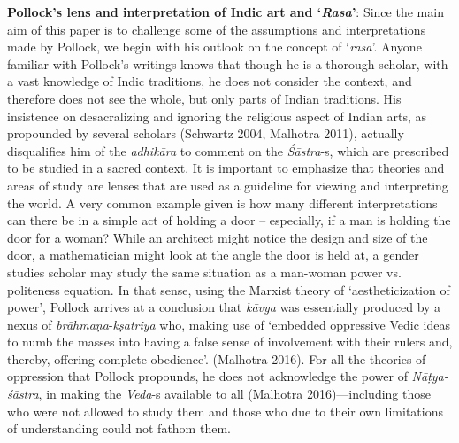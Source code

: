 \textbf{Pollock’s lens and interpretation of Indic art and ‘\textsl{Rasa}'}: Since the main aim of this paper is to challenge some of the assumptions and interpretations made by Pollock, we begin with his outlook on the concept of ‘\textsl{rasa}'. Anyone familiar with Pollock’s writings knows that though he is a thorough scholar, with a vast knowledge of Indic traditions, he does not consider the context, and therefore does not see the whole, but only parts of Indian traditions. His insistence on desacralizing and ignoring the religious aspect of Indian arts, as propounded by several scholars (Schwartz 2004, Malhotra 2011), actually disqualifies him of the \textsl{adhikāra} to comment on the \textsl{Śāstra}-s, which are prescribed to be studied in a sacred context. It is important to emphasize that theories and areas of study are lenses that are used as a guideline for viewing and interpreting the world. A very common example given is how many different interpretations can there be in a simple act of holding a door -- especially, if a man is holding the door for a woman? While an architect might notice the design and size of the door, a mathematician might look at the angle the door is held at, a gender studies scholar may study the same situation as a man-woman power vs. politeness equation. In that sense, using the Marxist theory of ‘aestheticization of power’, Pollock arrives at a conclusion that \textsl{kāvya} was essentially produced by a nexus of \textsl{brāhmaṇa}-\textsl{kṣatriya} who, making use of ‘embedded oppressive Vedic ideas to numb the masses into having a false sense of involvement with their rulers and, thereby, offering complete obedience’. (Malhotra 2016). For all the theories of oppression that Pollock propounds, he does not acknowledge the power of \textsl{Nāṭya-śāstra}, in making the \textsl{Veda}-s available to all (Malhotra 2016)---including those who were not allowed to study them and those who due to their own limitations of understanding could not fathom them. 

